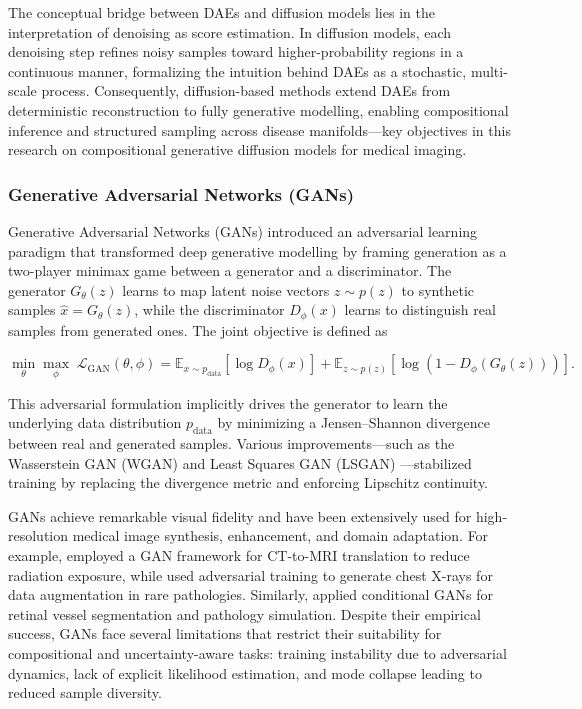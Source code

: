 \vspace{1em}

The conceptual bridge between DAEs and diffusion models lies in the interpretation of denoising as score estimation. In diffusion models, each denoising step refines noisy samples toward higher-probability regions in a continuous manner, formalizing the intuition behind DAEs as a stochastic, multi-scale process. Consequently, diffusion-based methods extend DAEs from deterministic reconstruction to fully generative modelling, enabling compositional inference and structured sampling across disease manifolds—key objectives in this research on compositional generative diffusion models for medical imaging.  
\subsubsection{Generative Adversarial Networks (GANs)}
Generative Adversarial Networks (GANs) \cite{goodfellow2014gan} introduced an adversarial learning paradigm that transformed deep generative modelling by framing generation as a two-player minimax game between a generator and a discriminator. The generator \( G_\theta(z) \) learns to map latent noise vectors \( z \sim p(z) \) to synthetic samples \( \hat{x} = G_\theta(z) \), while the discriminator \( D_\phi(x) \) learns to distinguish real samples from generated ones. The joint objective is defined as  

\begin{equation}
    \min_{\theta} \max_{\phi} \; \mathcal{L}_{\text{GAN}}(\theta, \phi)
    = \mathbb{E}_{x \sim p_{\text{data}}}[\log D_\phi(x)]
    + \mathbb{E}_{z \sim p(z)}[\log(1 - D_\phi(G_\theta(z)))].
\end{equation}

This adversarial formulation implicitly drives the generator to learn the underlying data distribution \( p_{\text{data}} \) by minimizing a Jensen–Shannon divergence between real and generated samples. Various improvements—such as the Wasserstein GAN (WGAN) \cite{arjovsky2017wgan} and Least Squares GAN (LSGAN) \cite{mao2017lsgan}—stabilized training by replacing the divergence metric and enforcing Lipschitz continuity.  

\vspace{1em}

GANs achieve remarkable visual fidelity and have been extensively used for high-resolution medical image synthesis, enhancement, and domain adaptation. For example, \cite{nie2018gan_mri} employed a GAN framework for CT-to-MRI translation to reduce radiation exposure, while \cite{frid2018gan_cxr} used adversarial training to generate chest X-rays for data augmentation in rare pathologies. Similarly, \cite{zhao2021gan_retinal} applied conditional GANs for retinal vessel segmentation and pathology simulation. Despite their empirical success, GANs face several limitations that restrict their suitability for compositional and uncertainty-aware tasks: training instability due to adversarial dynamics, lack of explicit likelihood estimation, and mode collapse leading to reduced sample diversity.  

